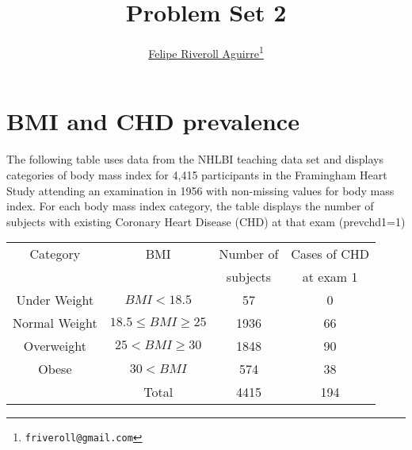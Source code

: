 \documentclass{article}
\begin{document}


\title{Problem Set 2}
\author{\href{http://feliperiveroll.name}{Felipe Riveroll Aguirre}\footnote{\texttt{friveroll@gmail.com}}} 
\maketitle
\section{BMI and CHD prevalence}

The following table uses data from the NHLBI teaching data set and displays categories of body mass index for 4,415 participants in the Framingham Heart Study attending an examination in 1956 with non-missing values for body mass index. For each body mass index category, the table displays the number of subjects with existing Coronary Heart  Disease (CHD) at that exam (prevchd1=1)\\

\begin{center}
\begin{tabular}{cccc}\hline
Category & BMI & Number of  & Cases of CHD \\
 && subjects & at exam 1\\\hline
Under Weight & \(BMI < 18.5\) & 57 & 0 \\
Normal Weight & \(18.5 \leq BMI \geq 25\) & 1936 & 66 \\
Overweight & \(25 < BMI \geq 30\) & 1848 & 90 \\
Obese & \(30 < BMI\) & 574 & 38 \\\hline
&Total & 4415 & 194 \\
\end{tabular}
\end{center}
\end{document}
